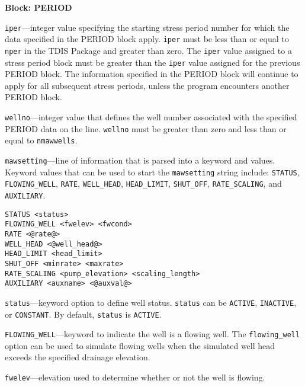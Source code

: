 \item \textbf{Block: PERIOD}

\begin{description}
\item \texttt{iper}---integer value specifying the starting stress period number for which the data specified in the PERIOD block apply.  \texttt{iper} must be less than or equal to \texttt{nper} in the TDIS Package and greater than zero.  The \texttt{iper} value assigned to a stress period block must be greater than the \texttt{iper} value assigned for the previous PERIOD block.  The information specified in the PERIOD block will continue to apply for all subsequent stress periods, unless the program encounters another PERIOD block.

\item \texttt{wellno}---integer value that defines the well number associated with the specified PERIOD data on the line. \texttt{wellno} must be greater than zero and less than or equal to \texttt{nmawwells}.

\item \texttt{mawsetting}---line of information that is parsed into a keyword and values.  Keyword values that can be used to start the \texttt{mawsetting} string include: \texttt{STATUS}, \texttt{FLOWING\_WELL}, \texttt{RATE}, \texttt{WELL\_HEAD}, \texttt{HEAD\_LIMIT}, \texttt{SHUT\_OFF}, \texttt{RATE\_SCALING}, and \texttt{AUXILIARY}.

\begin{lstlisting}[style=blockdefinition]
STATUS <status>
FLOWING_WELL <fwelev> <fwcond> 
RATE <@rate@>
WELL_HEAD <@well_head@>
HEAD_LIMIT <head_limit>
SHUT_OFF <minrate> <maxrate> 
RATE_SCALING <pump_elevation> <scaling_length> 
AUXILIARY <auxname> <@auxval@> 
\end{lstlisting}

\item \texttt{status}---keyword option to define well status.  \texttt{status} can be \texttt{ACTIVE}, \texttt{INACTIVE}, or \texttt{CONSTANT}. By default, \texttt{status} is \texttt{ACTIVE}.

\item \texttt{FLOWING\_WELL}---keyword to indicate the well is a flowing well.  The \texttt{flowing\_well} option can be used to simulate flowing wells when the simulated well head exceeds the specified drainage elevation.

\item \texttt{fwelev}---elevation used to determine whether or not the well is flowing.


\end{description}
